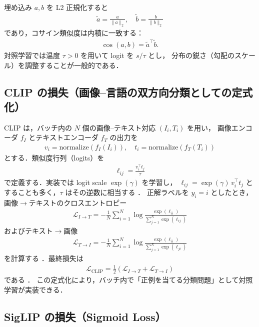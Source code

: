 埋め込み $a,b$ を L2 正規化すると
\begin{align}
  \tilde{a}=\frac{a}{\|a\|_2},\quad \tilde{b}=\frac{b}{\|b\|_2}
\end{align}
であり，コサイン類似度は内積に一致する：
\begin{align}
  \cos(a,b)=\tilde{a}^\top \tilde{b}.
\end{align}
対照学習では温度 $\tau>0$ を用いて logit を $s/\tau$ とし，
分布の鋭さ（勾配のスケール）を調整することが一般的である．

\subsection{CLIP の損失（画像--言語の双方向分類としての定式化）}
\label{subsec:CLIP_loss}

CLIP \cite{clip} は，バッチ内の $N$ 個の画像--テキスト対応 $(I_i,T_i)$ を用い，
画像エンコーダ $f_I$ とテキストエンコーダ $f_T$ の出力を
\begin{align}
  v_i = \mathrm{normalize}(f_I(I_i)),\quad
  t_i = \mathrm{normalize}(f_T(T_i))
\end{align}
とする．類似度行列（logits）を
\begin{align}
  \ell_{ij} = \frac{v_i^\top t_j}{\tau}
\end{align}
で定義する．実装では logit scale $\exp(\gamma)$ を学習し，
$\ell_{ij}=\exp(\gamma)\,v_i^\top t_j$ とすることも多く，$\tau$ はその逆数に相当する \cite{clip}．
正解ラベルを $y_i=i$ としたとき，画像$\rightarrow$テキストのクロスエントロピー
\begin{align}
  \mathcal{L}_{I\rightarrow T}
  = -\frac{1}{N}\sum_{i=1}^{N}\log
  \frac{\exp(\ell_{ii})}{\sum_{j=1}^{N}\exp(\ell_{ij})}
\end{align}
およびテキスト$\rightarrow$画像
\begin{align}
  \mathcal{L}_{T\rightarrow I}
  = -\frac{1}{N}\sum_{i=1}^{N}\log
  \frac{\exp(\ell_{ii})}{\sum_{j=1}^{N}\exp(\ell_{ji})}
\end{align}
を計算する \cite{clip}．最終損失は
\begin{align}
  \mathcal{L}_{\mathrm{CLIP}}=\frac{1}{2}\left(\mathcal{L}_{I\rightarrow T}+\mathcal{L}_{T\rightarrow I}\right)
  \label{eq:clip_loss}
\end{align}
である \cite{clip}．
この定式化により，バッチ内で「正例を当てる分類問題」として対照学習が実装できる．

\subsection{SigLIP の損失（Sigmoid Loss）}
\label{subsec:SigLIP_loss}

